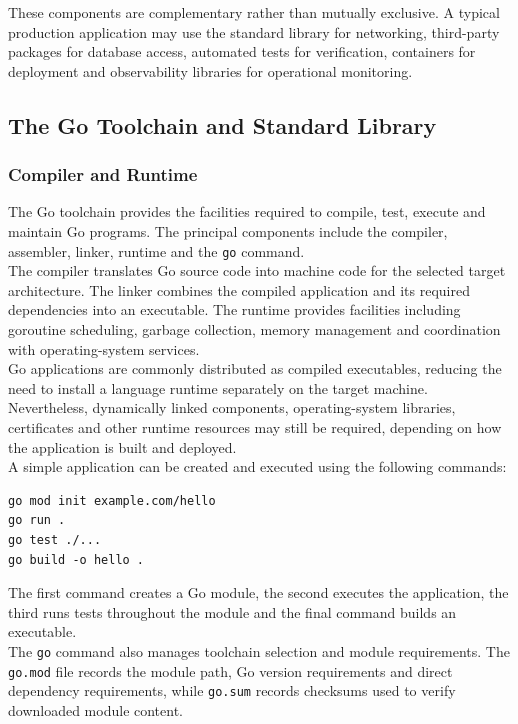 These components are complementary rather than mutually exclusive. A typical production application may use the standard library for networking, third-party packages for database access, automated tests for verification, containers for deployment and observability libraries for operational monitoring.

\subsection{The Go Toolchain and Standard Library}

\subsubsection{Compiler and Runtime}

The Go toolchain provides the facilities required to compile, test, execute and maintain Go programs. The principal components include the compiler, assembler, linker, runtime and the \texttt{go} command.\\

The compiler translates Go source code into machine code for the selected target architecture. The linker combines the compiled application and its required dependencies into an executable. The runtime provides facilities including goroutine scheduling, garbage collection, memory management and coordination with operating-system services.\\

Go applications are commonly distributed as compiled executables, reducing the need to install a language runtime separately on the target machine. Nevertheless, dynamically linked components, operating-system libraries, certificates and other runtime resources may still be required, depending on how the application is built and deployed.\\

A simple application can be created and executed using the following commands:

\begin{lstlisting}
go mod init example.com/hello
go run .
go test ./...
go build -o hello .
\end{lstlisting}

The first command creates a Go module, the second executes the application, the third runs tests throughout the module and the final command builds an executable.\\

The \texttt{go} command also manages toolchain selection and module requirements. The \texttt{go.mod} file records the module path, Go version requirements and direct dependency requirements, while \texttt{go.sum} records checksums used to verify downloaded module content.

